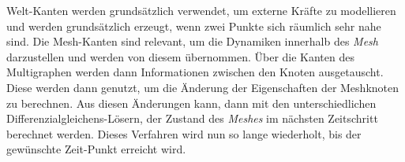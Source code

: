 Welt-Kanten werden grundsätzlich verwendet, um externe Kräfte zu modellieren und werden grundsätzlich erzeugt, 
wenn zwei Punkte sich räumlich sehr nahe sind.
Die Mesh-Kanten sind relevant, um die Dynamiken innerhalb des \textit{Mesh} darzustellen und werden von diesem übernommen.
Über die Kanten des Multigraphen werden dann Informationen zwischen den Knoten ausgetauscht.
Diese werden dann genutzt, um die Änderung der Eigenschaften der Meshknoten zu berechnen.
Aus diesen Änderungen kann, dann mit den unterschiedlichen Differenzialgleichens-Lösern, der Zustand des \textit{Meshes} im nächsten Zeitschritt berechnet werden. 
Dieses Verfahren wird nun so lange wiederholt, bis der gewünschte Zeit-Punkt erreicht wird.









